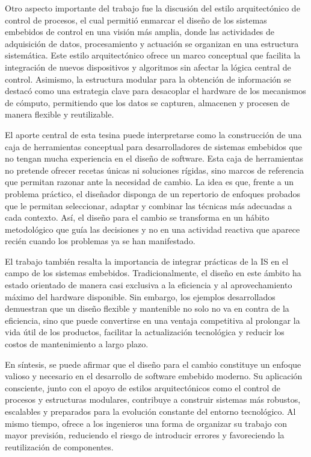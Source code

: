 Otro aspecto importante del trabajo fue la discusión del estilo arquitectónico de control de procesos, el cual permitió enmarcar el diseño de los sistemas embebidos de control en una visión más amplia, donde las actividades de adquisición de datos, procesamiento y actuación se organizan en una estructura sistemática. Este estilo arquitectónico ofrece un marco conceptual que facilita la integración de nuevos dispositivos y algoritmos sin afectar la lógica central de control. Asimismo, la estructura modular para la obtención de información se destacó como una estrategia clave para desacoplar el hardware de los mecanismos de cómputo, permitiendo que los datos se capturen, almacenen y procesen de manera flexible y reutilizable.

El aporte central de esta tesina puede interpretarse como la construcción de una caja de herramientas conceptual para desarrolladores de sistemas embebidos que no tengan mucha experiencia en el diseño de software. Esta caja de herramientas no pretende ofrecer recetas únicas ni soluciones rígidas, sino marcos de referencia que permitan razonar ante la necesidad de cambio. La idea es que, frente a un problema práctico, el diseñador disponga de un repertorio de enfoques probados que le permitan seleccionar, adaptar y combinar las técnicas más adecuadas a cada contexto. Así, el diseño para el cambio se transforma en un hábito metodológico que guía las decisiones y no en una actividad reactiva que aparece recién cuando los problemas ya se han manifestado.

El trabajo también resalta la importancia de integrar prácticas de la \gls{IS} en el campo de los sistemas embebidos. Tradicionalmente, el diseño en este ámbito ha estado orientado de manera casi exclusiva a la eficiencia y al aprovechamiento máximo del hardware disponible. Sin embargo, los ejemplos desarrollados demuestran que un diseño flexible y mantenible no solo no va en contra de la eficiencia, sino que puede convertirse en una ventaja competitiva al prolongar la vida útil de los productos, facilitar la actualización tecnológica y reducir los costos de mantenimiento a largo plazo.

En síntesis, se puede afirmar que el diseño para el cambio constituye un enfoque valioso y necesario en el desarrollo de software embebido moderno. Su aplicación consciente, junto con el apoyo de estilos arquitectónicos como el control de procesos y estructuras modulares, contribuye a construir sistemas más robustos, escalables y preparados para la evolución constante del entorno tecnológico. Al mismo tiempo, ofrece a los ingenieros una forma de organizar su trabajo con mayor previsión, reduciendo el riesgo de introducir errores y favoreciendo la reutilización de componentes.